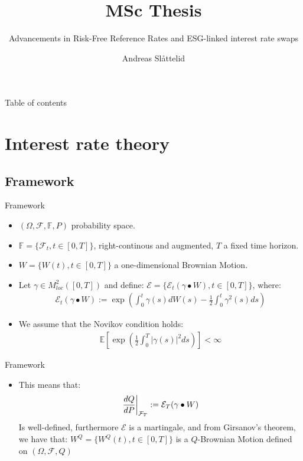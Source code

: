 \documentclass[UKenglish]{beamer}
\author{Andreas Slåttelid}
\title{MSc Thesis}
\subtitle{Advancements in Risk-Free Reference Rates and ESG-linked interest rate swaps}
\newcommand{\E}{\mathbb{E}}  %
\newcommand{\F}{\mathcal{F}} %
\begin{document}


%
%
\begin{frame}{Table of contents}
    \tableofcontents[currentsection]
\end{frame}


\section{Interest rate theory}
\SectionPage
\subsection{Framework}

\begin{frame}{Framework}
\begin{itemize}
    \item $(\Omega, \F, \mathbb{F}, P)$ probability space.  
    \item $\mathbb{F} = \{\F_{t}, t \in [0,T]\}$, right-continous and augmented, $T$ a fixed time horizon. 
    \item $W = \{W(t), t\in [0,T]\}$ a one-dimensional Brownian Motion. 
    \item Let $\gamma \in M^{2}_{loc}([0,T])$ and define:
    $\mathcal{E} = \{\mathcal{E}_{t}(\gamma \bullet W), t \in [0,T]\}$, where:
    \begin{align*}
     \mathcal{E}_{t}(\gamma \bullet W) := \exp\left(
     \int_{0}^{t}\gamma(s)dW(s) -\frac{1}{2}\int_{0}^{t}\gamma^{2}(s)ds
     \right)   
    \end{align*}
    \item We assume that the Novikov condition holds:
    \begin{align*}
     \E\left[
     \exp\left(
     \frac{1}{2}\int_{0}^{T}|\gamma(s)|^{2}ds
     \right)
     \right] < \infty   
    \end{align*}
\end{itemize}
\end{frame}


\begin{frame}{Framework}
\begin{itemize}
    \item This means that: 
    \begin{align*}
    \frac{dQ}{dP}\bigg{|}_{\F_{T}} := \mathcal{E}_{T}(\gamma \bullet W)   
    \end{align*}
    Is well-defined, furthermore $\mathcal{E}$ is a martingale, and from Girsanov's theorem, we have that: $W^{Q} = \{W^{Q}(t), t\in [0,T]\} $ is a $Q$-Brownian Motion defined on $(\Omega, \F, Q)$
\end{itemize} 
\end{frame}
\end{document}
